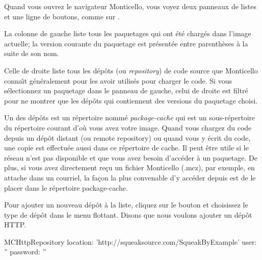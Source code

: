 \documentclass[a4paper,10pt,twoside]{book}
\begin{document}
Quand vous ouvrez le navigateur Monticello, vous voyez deux panneaux
de listes et une ligne de boutons, comme sur .

La colonne de gauche liste tous les paquetages qui ont \'et\'e charg\'es
dans l'image actuelle; la version courante du paquetage est
pr\'esent\'ee entre parenth\`eses \`a la suite de son nom.

Celle de droite liste tous les d\'ep\^ots (ou \emph{repository}) de code
source que Monticello conna\^{\i}t g\'en\'eralement pour les avoir utilis\'es
pour charger le code. Si vous s\'electionnez un paquetage dans le panneau de 
gauche, celui de droite est filtr\'e pour ne montrer que les d\'ep\^ots
qui contiennent des versions du paquetage choisi.

Un des d\'ep\^ots est un r\'epertoire nomm\'e \emph{package-cache} qui
est un sous-r\'epertoire du r\'epertoire courant d'o\`u vous avez
votre image.
Quand vous chargez du code depuis un d\'ep\^ot distant (ou remote repository)
ou quand vous y \'ecrit du code, une copie est effectu\'ee aussi dans ce
r\'epertoire de cache. Il peut \^etre utile si le r\'eseau n'est pas 
disponible et que vous avez besoin d'acc\'eder \`a un paquetage. De plus,
si vous avez directement re\c{c}u un fichier Monticello (.mcz), par exemple, 
en attache dans un courriel, la fa\c{c}on la plus convenable d'y acc\'eder
depuis \sq est de le placer dans le r\'epertoire package-cache.

Pour ajouter un nouveau d\'ep\^ot \`a la liste, cliquez sur le bouton 
 et choisissez le type de d\'ep\^ot dans le menu
flottant. Disons que nous voulons ajouter un d\'ep\^ot HTTP.

\begin{code}{}
MCHttpRepository
	location: 'http://squeaksource.com/SqueakByExample'
	user: ''
	password: ''
\end{code}
\end{document}
